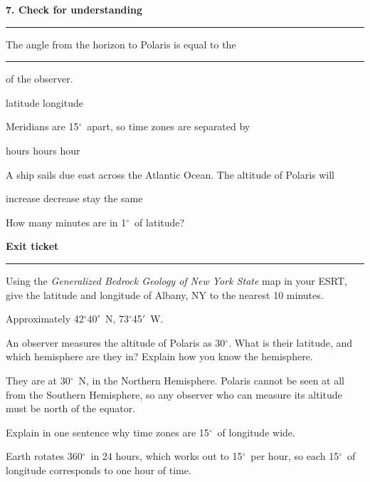 \documentclass[11pt,addpoints]{exam}
\newcommand{\dg}{\ensuremath{^{\circ}}}
\newcommand{\mn}{\ensuremath{'}}
\newcommand{\sectiontitle}[1]{%
  \needspace{6\baselineskip}%
  \vspace{0.6\baselineskip}%
  \noindent\textbf{\large #1}\par\nopagebreak
  \vspace{-0.4\baselineskip}\noindent\rule{\linewidth}{0.8pt}\par\nopagebreak
  \vspace{0.2\baselineskip}}
\begin{document}
\sectiontitle{7. Check for understanding}

\begin{questions}

\question[1] The angle from the horizon to Polaris is equal to the \rule{0.9in}{0.4pt}
of the observer.
\begin{choices}
  \CorrectChoice latitude
  \choice longitude
\end{choices}

\question[1] Meridians are 15\dg\ apart, so time zones are separated by
\begin{choices}
   hours
   hours
   hour
\end{choices}

\question[1] A ship sails due east across the Atlantic Ocean. The altitude of
Polaris will
\begin{choices}
  \choice increase
  \choice decrease
  \CorrectChoice stay the same
\end{choices}

\question[1] How many minutes are in 1\dg\ of latitude?
\begin{choices}
\end{choices}

\end{questions}

\sectiontitle{Exit ticket}

\begin{questions}

\question[2] Using the \textit{Generalized Bedrock Geology of New York State} map in
your ESRT, give the latitude and longitude of Albany, NY to the nearest 10 minutes.

\begin{solutionorbox}[0.55in]
Approximately 42\dg40\mn\ N, 73\dg45\mn\ W.
\end{solutionorbox}

\question[2] An observer measures the altitude of Polaris as 30\dg. What is their
latitude, and which hemisphere are they in? Explain how you know the hemisphere.

\begin{solutionorbox}[0.85in]
They are at 30\dg\ N, in the Northern Hemisphere. Polaris cannot be seen at all
from the Southern Hemisphere, so any observer who can measure its altitude must be
north of the equator.
\end{solutionorbox}

\question[2] Explain in one sentence why time zones are 15\dg\ of longitude wide.

\begin{solutionorbox}[0.7in]
Earth rotates 360\dg\ in 24 hours, which works out to 15\dg\ per hour, so each
15\dg\ of longitude corresponds to one hour of time.
\end{solutionorbox}

\end{questions}
\end{document}
